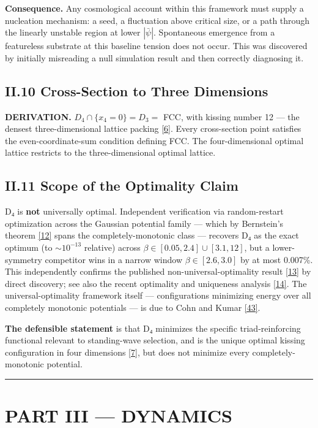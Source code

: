 \documentclass[a4paper,11pt]{article}
\begin{document}
\textbf{Consequence.} Any cosmological account within this framework must supply a nucleation mechanism: a seed, a fluctuation above critical size, or a path through the linearly unstable region at lower $|\bar\psi|$. Spontaneous emergence from a featureless substrate at this baseline tension does not occur. This was discovered by initially misreading a null simulation result and then correctly diagnosing it.

\subsection*{II.10 Cross-Section to Three Dimensions}

\textbf{DERIVATION.} $D_4\cap\{x_4=0\}=D_3=$ FCC, with kissing number 12 — the densest three-dimensional lattice packing \hyperref[ref6]{[6]}. Every cross-section point satisfies the even-coordinate-sum condition defining FCC. The four-dimensional optimal lattice restricts to the three-dimensional optimal lattice.

\subsection*{II.11 Scope of the Optimality Claim}

D₄ is \textbf{not} universally optimal. Independent verification via random-restart optimization across the Gaussian potential family — which by Bernstein's theorem \hyperref[ref12]{[12]} spans the completely-monotonic class — recovers D₄ as the exact optimum (to $\sim10^{-13}$ relative) across $\beta\in[0.05,2.4]\cup[3.1,12]$, but a lower-symmetry competitor wins in a narrow window $\beta\in[2.6,3.0]$ by at most 0.007\%. This independently confirms the published non-universal-optimality result \hyperref[ref13]{[13]} by direct discovery; see also the recent optimality and uniqueness analysis \hyperref[ref14]{[14]}. The universal-optimality framework itself — configurations minimizing energy over all completely monotonic potentials — is due to Cohn and Kumar \hyperref[ref43]{[43]}.

\textbf{The defensible statement} is that D₄ minimizes the specific triad-reinforcing functional relevant to standing-wave selection, and is the unique optimal kissing configuration in four dimensions \hyperref[ref7]{[7]}, but does not minimize every completely-monotonic potential.

\medskip\hrule\medskip

\section*{PART III — DYNAMICS}
\end{document}
